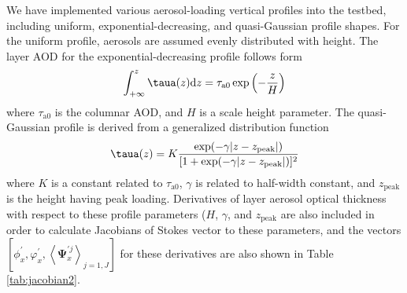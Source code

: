 We have implemented various aerosol-loading vertical profiles into the testbed,
including uniform, exponential-decreasing, and quasi-Gaussian profile shapes.
For the uniform profile, aerosols are assumed evenly distributed with height.
The layer AOD for the exponential-decreasing profile follows form
\begin{equation}
\int_{+\infty}^z\taua(z)\text{d}z = \tau_\text{a0}\exp\left(-\frac{z}{H}\right)
\end{equation}
where $\tau_\text{a0}$ is the columnar AOD, and $H$ is a scale height 
parameter. The quasi-Gaussian profile is derived from a generalized 
distribution function \citep{Spurr14}
\begin{equation}
\taua(z)=K\frac{\exp(-\gamma|z-z_\text{peak}|)}{[1+\exp(-\gamma|z-z_\text{peak}|)]^2}
\end{equation}
where $K$ is a constant related to $\tau_\text{a0}$, $\gamma$ is related to 
half-width constant, and $z_\text{peak}$ is the height having peak loading. 
Derivatives of layer aerosol optical thickness with respect to these profile 
parameters ($H$, $\gamma$, and $z_\text{peak}$ are also included in order to 
calculate Jacobians of Stokes vector to these parameters, and the vectors 
$\left[ \phi_x^\prime, \varphi_x^\prime, \left<\pmb{\Psi}_x^{\prime j}\right>_{j=1,J}\right]$ 
for these derivatives are also shown in Table \ref{tab:jacobian2}.
